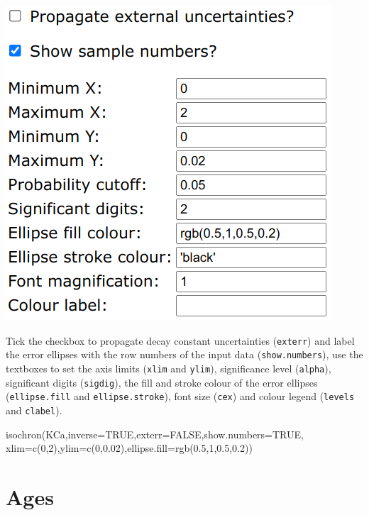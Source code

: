 \begin{refsection}
\begin{enumerate}
\noindent\begin{minipage}[t]{.45\linewidth}
\strut\vspace*{-\baselineskip}\newline
\includegraphics[width=\linewidth]{../figures/KCaIsochronOtherOptions.png}
\end{minipage}
\begin{minipage}[t]{.55\linewidth}
Tick the checkbox to propagate decay constant uncertainties
(\texttt{exterr}) and label the error ellipses with the row numbers of
the input data (\texttt{show.numbers}), use the textboxes to set the
axis limits (\texttt{xlim} and \texttt{ylim}), significance level
(\texttt{alpha}), significant digits (\texttt{sigdig}), the fill and
stroke colour of the error ellipses (\texttt{ellipse.fill} and
\texttt{ellipse.stroke}), font size (\texttt{cex}) and colour legend
(\texttt{levels} and \texttt{clabel}).
\end{minipage}

\begin{script}
isochron(KCa,inverse=TRUE,exterr=FALSE,show.numbers=TRUE,
         xlim=c(0,2),ylim=c(0,0.02),ellipse.fill=rgb(0.5,1,0.5,0.2))
\end{script}
  
\end{enumerate}

\section{Ages}\label{sec:ArArKCaAges}


\end{refsection}

